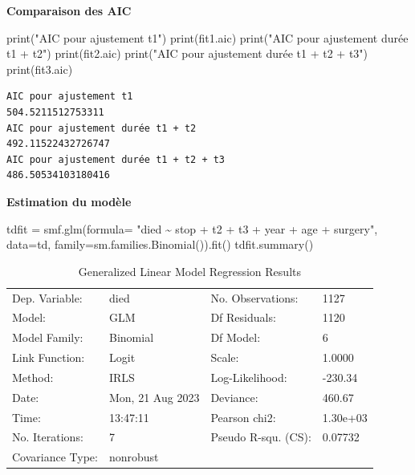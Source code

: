 \documentclass[
  12pt,
  letterpaper,
  DIV=11,
  numbers=noendperiod,
  onepage,
  openany]{scrreprt}
\newenvironment{Shaded}{\begin{snugshade}}{\end{snugshade}}
\newcommand{\BuiltInTok}[1]{\textcolor[rgb]{0.80,0.80,0.80}{#1}}
\newcommand{\NormalTok}[1]{\textcolor[rgb]{0.80,0.80,0.80}{#1}}
\newcommand{\OperatorTok}[1]{\textcolor[rgb]{0.94,0.94,0.82}{#1}}
\newcommand{\StringTok}[1]{\textcolor[rgb]{0.80,0.58,0.58}{#1}}
\begin{document}
\textbf{Comparaison des AIC}

\begin{Shaded}
\begin{Highlighting}[]
\BuiltInTok{print}\NormalTok{(}\StringTok{"AIC pour ajustement t1"}\NormalTok{)}
\BuiltInTok{print}\NormalTok{(fit1.aic)}
\BuiltInTok{print}\NormalTok{(}\StringTok{"AIC pour ajustement durée t1 + t2"}\NormalTok{)}
\BuiltInTok{print}\NormalTok{(fit2.aic)}
\BuiltInTok{print}\NormalTok{(}\StringTok{"AIC pour ajustement durée t1 + t2 + t3"}\NormalTok{)}
\BuiltInTok{print}\NormalTok{(fit3.aic)}
\end{Highlighting}
\end{Shaded}

\begin{verbatim}
AIC pour ajustement t1
504.5211512753311
AIC pour ajustement durée t1 + t2
492.11522432726747
AIC pour ajustement durée t1 + t2 + t3
486.50534103180416
\end{verbatim}

\textbf{Estimation du modèle}

\begin{Shaded}
\begin{Highlighting}[]
\NormalTok{tdfit }\OperatorTok{=}\NormalTok{ smf.glm(formula}\OperatorTok{=}  \StringTok{"died \textasciitilde{} stop + t2 + t3 + year + age + surgery"}\NormalTok{, data}\OperatorTok{=}\NormalTok{td, family}\OperatorTok{=}\NormalTok{sm.families.Binomial()).fit()}
\NormalTok{tdfit.summary()}
\end{Highlighting}
\end{Shaded}

\begin{longtable}[]{@{}llll@{}}
\caption{Generalized Linear Model Regression Results}\tabularnewline
\toprule\noalign{}
\endfirsthead
\endhead
\bottomrule\noalign{}
\endlastfoot
Dep. Variable: & died & No. Observations: & 1127 \\
Model: & GLM & Df Residuals: & 1120 \\
Model Family: & Binomial & Df Model: & 6 \\
Link Function: & Logit & Scale: & 1.0000 \\
Method: & IRLS & Log-Likelihood: & -230.34 \\
Date: & Mon, 21 Aug 2023 & Deviance: & 460.67 \\
Time: & 13:47:11 & Pearson chi2: & 1.30e+03 \\
No. Iterations: & 7 & Pseudo R-squ. (CS): & 0.07732 \\
Covariance Type: & nonrobust & & \\
\end{longtable}
\end{document}
